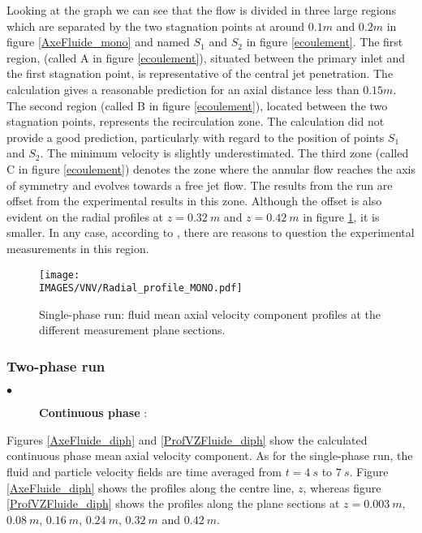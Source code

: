 \noindent
Looking at the graph we can see that the flow is divided in three large regions which are separated by the two stagnation points at around $0.1m$ and $0.2m$ in figure \ref{AxeFluide_mono} and named $S_{1}$ and $S_{2}$ in figure \ref{ecoulement}. The first region, (called A in figure \ref{ecoulement}), situated between the primary inlet and the first stagnation point, is representative of the central jet penetration. The calculation gives a reasonable prediction for an axial distance less than $0.15m$. The second region (called B in figure \ref{ecoulement}), located between the two stagnation points, represents the recirculation zone. The calculation did not provide a good prediction, particularly with regard to the position of points $S_{1}$ and $S_{2}$. The minimum velocity is slightly underestimated. The third zone (called C in figure \ref{ecoulement}) denotes the zone where the annular flow reaches the axis of symmetry and evolves towards a free jet flow. The results from the run are offset from the experimental results in this zone. Although the offset is also evident on the radial profiles at $z=0.32~m$ and $z=0.42~m$ in figure \ref{ProfVZFluide_mono}, it is smaller. In any case, according to \cite{Rap3}, there are reasons to question the experimental measurements in this region.

\begin{figure}[H]
   \centerline{\texttt{[image: \\IMAGES/VNV/Radial\_profile\_MONO.pdf]}}
   \caption{Single-phase run: fluid mean axial velocity component profiles at the different measurement plane sections.}
   \label{ProfVZFluide_mono}
\end{figure}

\clearpage

\subsubsection{Two-phase run}

\begin{description}
   \item[$\bullet$] \textbf{Continuous phase} :
\end{description}

Figures \ref{AxeFluide_diph} and \ref{ProfVZFluide_diph} show the calculated continuous phase mean axial velocity component. As for the single-phase run, the fluid and particle velocity fields are time averaged from $t=4~s$ to $7~s$. Figure \ref{AxeFluide_diph} shows the profiles along the centre line, $z$, whereas figure \ref{ProfVZFluide_diph} shows the profiles along the plane sections at $z = 0.003~m$, $0.08~m$, $0.16~m$, $0.24~m$, $0.32~m$ and $0.42~m$.

